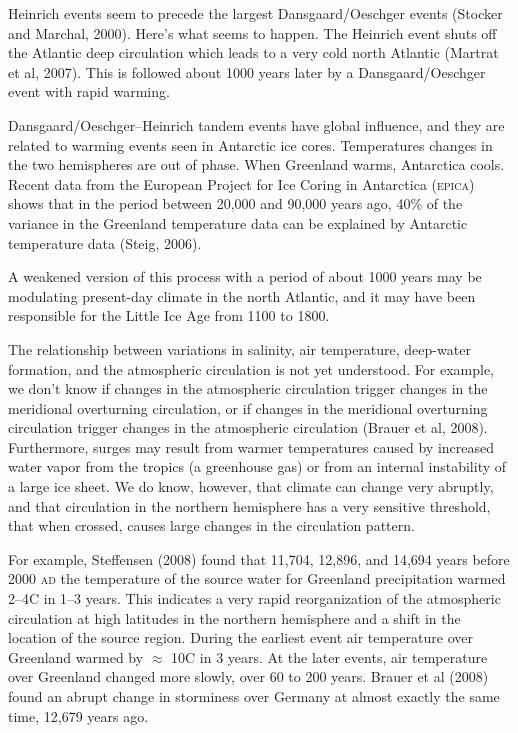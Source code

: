 \begin{enumerate}
\vitem Heinrich events seem to precede the largest Dansgaard/Oeschger events (Stocker and Marchal, 2000). Here's what seems to happen. The Heinrich event shuts off the Atlantic deep circulation which leads to a very cold north Atlantic (Martrat et al, 2007). This is followed about 1000 years later by a Dansgaard/Oeschger event with rapid warming. 

\vitem Dansgaard/Oeschger--Heinrich tandem events have global influence, and they are related to warming events seen in Antarctic ice cores. Temperatures changes in the two hemispheres are out of phase. When Greenland warms, Antarctica cools. Recent data from the European Project for Ice Coring in Antarctica (\textsc{epica}) shows that in the period between 20,000 and 90,000 years ago, 40\% of the variance in the Greenland temperature data can be explained by Antarctic temperature data (Steig, 2006).

\vitem A weakened version of this process with a period of about 1000 years may be modulating present-day climate in the north Atlantic, and it may have been responsible for the Little Ice Age from 1100 to 1800.
\end{enumerate}

The relationship between variations in salinity, air temperature, deep-water formation, and the atmospheric circulation is not yet understood. For example, we don't know if changes in the atmospheric circulation trigger changes in the meridional overturning circulation, or if changes in the meridional overturning circulation trigger changes in the atmospheric circulation (Brauer et al, 2008). Furthermore, surges may result from warmer temperatures caused by increased water vapor from the tropics (a greenhouse gas) or from an internal instability of a large ice sheet. We do know, however, that climate can change very abruptly, and that circulation in the northern hemisphere has a very sensitive threshold, that when crossed, causes large changes in the circulation pattern.

For example, Steffensen (2008) found that 11,704, 12,896, and 14,694 years before 2000 \textsc{ad} the temperature of the source water for Greenland precipitation warmed 2--4\degrees C in 1--3 years. This indicates a very rapid reorganization of the atmospheric circulation at high latitudes in the northern hemisphere and a shift in the location of the source region. During the earliest event air temperature over Greenland warmed by $\approx$ 10\degrees C in 3 years. At the later events, air temperature over Greenland changed more slowly, over 60 to 200 years. Brauer et al (2008) found an abrupt change in storminess over Germany at almost exactly the same time, 12,679 years ago.


